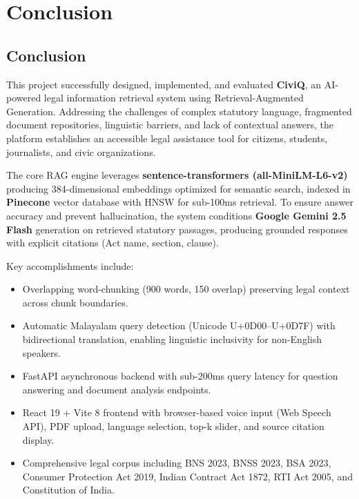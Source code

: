 \documentclass[12pt,a4paper]{report}
\begin{document}
\chapter{Conclusion}

\section{Conclusion}
This project successfully designed, implemented, and evaluated \textbf{CiviQ}, an AI-powered legal information retrieval system using Retrieval-Augmented Generation. Addressing the challenges of complex statutory language, fragmented document repositories, linguistic barriers, and lack of contextual answers, the platform establishes an accessible legal assistance tool for citizens, students, journalists, and civic organizations.

The core RAG engine leverages \textbf{sentence-transformers (all-MiniLM-L6-v2)} producing 384-dimensional embeddings optimized for semantic search, indexed in \textbf{Pinecone} vector database with HNSW for sub-100ms retrieval. To ensure answer accuracy and prevent hallucination, the system conditions \textbf{Google Gemini 2.5 Flash} generation on retrieved statutory passages, producing grounded responses with explicit citations (Act name, section, clause).

Key accomplishments include:
\begin{itemize}
    \item Overlapping word-chunking (900 words, 150 overlap) preserving legal context across chunk boundaries.
    \item Automatic Malayalam query detection (Unicode U+0D00–U+0D7F) with bidirectional translation, enabling linguistic inclusivity for non-English speakers.
    \item FastAPI asynchronous backend with sub-200ms query latency for question answering and document analysis endpoints.
    \item React 19 + Vite 8 frontend with browser-based voice input (Web Speech API), PDF upload, language selection, top-k slider, and source citation display.
    \item Comprehensive legal corpus including BNS 2023, BNSS 2023, BSA 2023, Consumer Protection Act 2019, Indian Contract Act 1872, RTI Act 2005, and Constitution of India.
\end{itemize}
\end{document}

